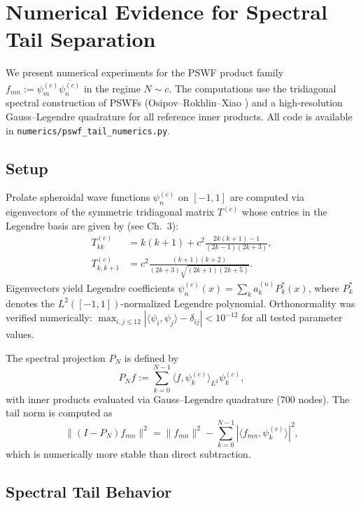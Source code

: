 
\section{Numerical Evidence for Spectral Tail Separation}
\label{sec:numerics}

We present numerical experiments for the PSWF product family
$f_{mn} := \psi_m^{(c)}\overline{\psi_n^{(c)}}$
in the regime $N \sim c$.
The computations use the tridiagonal spectral construction
of PSWFs (Osipov--Rokhlin--Xiao \cite{Osipov2013})
and a high-resolution Gauss--Legendre quadrature
for all reference inner products.
All code is available in \texttt{numerics/pswf\_tail\_numerics.py}.

\subsection{Setup}
\label{sec:numerics-setup}

Prolate spheroidal wave functions $\psi_n^{(c)}$ on $[-1,1]$
are computed via eigenvectors of the
symmetric tridiagonal matrix $T^{(c)}$
whose entries in the Legendre basis are given by
(see \cite{Osipov2013} Ch.~3):
\begin{align*}
  T^{(c)}_{kk} &= k(k+1)
    + c^2 \frac{2k(k+1)-1}{(2k-1)(2k+3)}, \\
  T^{(c)}_{k,k+1} &= c^2
    \frac{(k+1)(k+2)}{(2k+3)\sqrt{(2k+1)(2k+5)}}.
\end{align*}
Eigenvectors yield Legendre coefficients
$\psi_n^{(c)}(x) = \sum_k a_k^{(n)} P_k^*(x)$,
where $P_k^*$ denotes the $L^2([-1,1])$-normalized Legendre polynomial.
Orthonormality was verified numerically:
$\max_{i,j \le 12}|\langle\psi_i,\psi_j\rangle - \delta_{ij}| < 10^{-12}$
for all tested parameter values.

The spectral projection $P_N$ is defined by
\[
  P_N f := \sum_{k=0}^{N-1} \langle f, \psi_k^{(c)} \rangle_{L^2}
  \psi_k^{(c)},
\]
with inner products evaluated via Gauss--Legendre quadrature
(700 nodes).
The tail norm is computed as
\[
  \|(I-P_N)f_{mn}\|^2
  = \|f_{mn}\|^2
  - \sum_{k=0}^{N-1}
  |\langle f_{mn}, \psi_k^{(c)} \rangle|^2,
\]
which is numerically more stable than direct subtraction.

\subsection{Spectral Tail Behavior}
\label{sec:numerics-tail}

